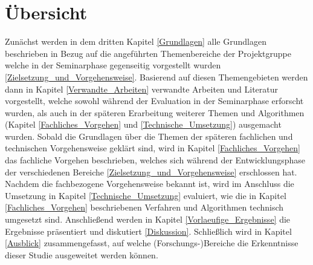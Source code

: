 \section{Übersicht}

Zunächst werden in dem dritten Kapitel \ref{Grundlagen} alle Grundlagen beschrieben in Bezug auf die angeführten Themenbereiche der Projektgruppe welche in der Seminarphase gegenseitig vorgestellt wurden \ref{Zielsetzung_und_Vorgehensweise}. Basierend auf diesen Themengebieten werden dann in Kapitel \ref{Verwandte_Arbeiten} verwandte Arbeiten und Literatur vorgestellt, welche sowohl während der Evaluation in der Seminarphase erforscht wurden, als auch in der späteren Erarbeitung weiterer Themen und Algorithmen (Kapitel \ref{Fachliches_Vorgehen} und \ref{Technische_Umsetzung}) ausgemacht wurden. Sobald die Grundlagen über die Themen der späteren fachlichen und technischen Vorgehensweise geklärt sind, wird in Kapitel \ref{Fachliches_Vorgehen} das fachliche Vorgehen beschrieben, welches sich während der Entwicklungsphase der verschiedenen Bereiche \ref{Zielsetzung_und_Vorgehensweise} erschlossen hat. Nachdem die fachbezogene Vorgehensweise bekannt ist, wird im Anschluss die Umsetzung in Kapitel \ref{Technische_Umsetzung} evaluiert, wie die in Kapitel \ref{Fachliches_Vorgehen} beschriebenen Verfahren und Algorithmen technisch umgesetzt sind. Anschließend werden in Kapitel \ref{Vorlaeufige_Ergebnisse} die Ergebnisse präsentiert und diskutiert \ref{Diskussion}. Schließlich wird in Kapitel \ref{Ausblick} zusammengefasst, auf welche (Forschungs-)Bereiche die Erkenntnisse dieser Studie ausgeweitet werden können.